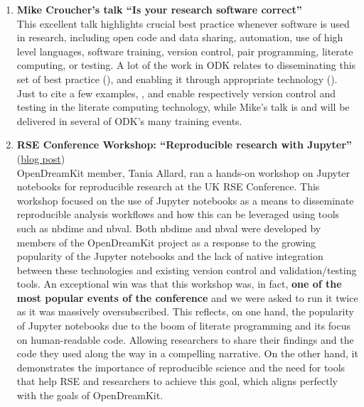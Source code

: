 \begin{enumerate}
\item \textbf{Mike Croucher's talk ``Is your research software correct''}\\
  This excellent talk highlights crucial best practice whenever
  software is used in research, including open code and data sharing,
  automation, use of high level languages, software training, version
  control, pair programming, literate computing, or testing. A lot of
  the work in ODK relates to disseminating this set of best practice
  (), and enabling it through appropriate technology
  (). Just to cite a few examples,
  , and
   enable respectively version control
  and testing in the \Jupyter literate computing technology, while
  Mike's talk is and will be delivered in several of ODK's many
  training events.

\item \textbf{RSE Conference Workshop: ``Reproducible research with Jupyter''}
  (\href{https://opendreamkit.org/2018/03/07/opendreamkit-at-the-rse-conference/}{blog post})\\
  OpenDreamKit member, Tania Allard, ran a hands-on workshop on
  Jupyter notebooks for reproducible research at the UK RSE
  Conference. This workshop focused on the use of Jupyter notebooks as
  a means to disseminate reproducible analysis workflows and how this
  can be leveraged using tools such as nbdime and nbval. Both nbdime
  and nbval were developed by members of the OpenDreamKit project as a
  response to the growing popularity of the Jupyter notebooks and the
  lack of native integration between these technologies and existing
  version control and validation/testing tools. An exceptional win was
  that this workshop was, in fact, \textbf{one of the most popular events of
  the conference} and we were asked to run it twice as it was massively
  oversubscribed. This reflects, on one hand, the popularity of
  Jupyter notebooks due to the boom of literate programming and its
  focus on human-readable code. Allowing researchers to share their
  findings and the code they used along the way in a compelling
  narrative. On the other hand, it demonstrates the importance of
  reproducible science and the need for tools that help RSE and
  researchers to achieve this goal, which aligns perfectly with the
  goals of OpenDreamKit.


\end{enumerate}
